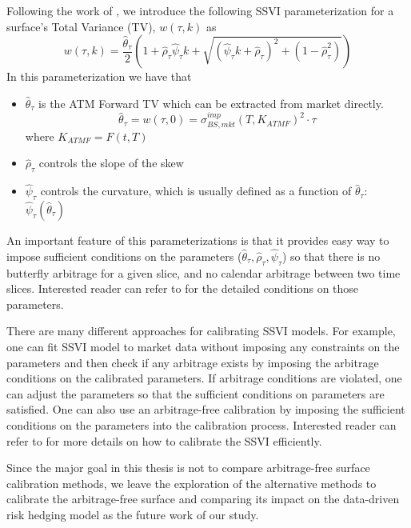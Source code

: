 \documentclass[letterpaper,12pt,titlepage,oneside,final]{book}
\numberwithin{equation}{section}
\theoremstyle{definition}
\begin{document}
 Following the work of \cite{corbetta2019robust}, we introduce the following SSVI parameterization for a surface's Total Variance (TV), $w(\tau,k)$ as
 \begin{equation}
 w(\tau,k) = \frac{\hat{\theta}_{\tau}}{2}\left( 1 + \hat{\rho}_{\tau} \hat{\psi}_{\tau} k + \sqrt{ \left(\hat{\psi}_{\tau} k + \hat{\rho}_{\tau} \right)^2 + \left(1 - \hat{\rho}_{\tau}^2 \right) } \right)
 \label{eqn:w}
 \end{equation}
 In this parameterization we have that 
 \begin{itemize}
 \item $\hat{\theta}_{\tau}$ is the ATM Forward TV which can be extracted from market directly.
 \[
 \hat{\theta}_{\tau} = w(\tau,0) = \sigma^{imp}_{BS,mkt}(T,K_{ATMF})^2 \cdot \tau
 \]
 where $K_{ATMF}=F(t,T)$
  \item $\hat{\rho}_{\tau}$ controls the slope of the skew 
 \item $\hat{\psi}_{\tau}$ controls the curvature, which is usually defined as a function of  $\hat{\theta}_{\tau}$: $\hat{\psi}_{\tau}(\hat{\theta}_{\tau})$
 \end{itemize}
 
 An important feature of this parameterizations is that it provides easy way to impose sufficient conditions on the  parameters ($\hat{\theta}_{\tau},\hat{\rho}_{\tau},\hat{\psi}_{\tau}$) so that there is no butterfly arbitrage for a given slice, and no calendar arbitrage between two time slices. Interested reader can refer to \cite{corbetta2019robust,gatheral2014arbitrage} for the detailed conditions on those parameters. 
 
 There are many different approaches for calibrating SSVI models. For example, one can  fit SSVI model to market data without imposing any constraints on the parameters and then check if any arbitrage exists by imposing the arbitrage conditions on  the calibrated parameters. If arbitrage conditions are violated, one can adjust the parameters so that the sufficient conditions on parameters are satisfied.
 One can also  use an arbitrage-free calibration \cite{corbetta2019robust} by imposing the  sufficient conditions on the parameters into the calibration process. Interested reader can refer to \cite{hendriks2017extended,corbetta2019robust} for more details on how to calibrate the SSVI efficiently.
  
Since the major goal in this thesis is not to compare  arbitrage-free surface calibration methods, we leave the exploration of the alternative methods to calibrate the arbitrage-free surface and comparing its impact on the data-driven risk hedging model as the future work of our study. 
\end{document}
